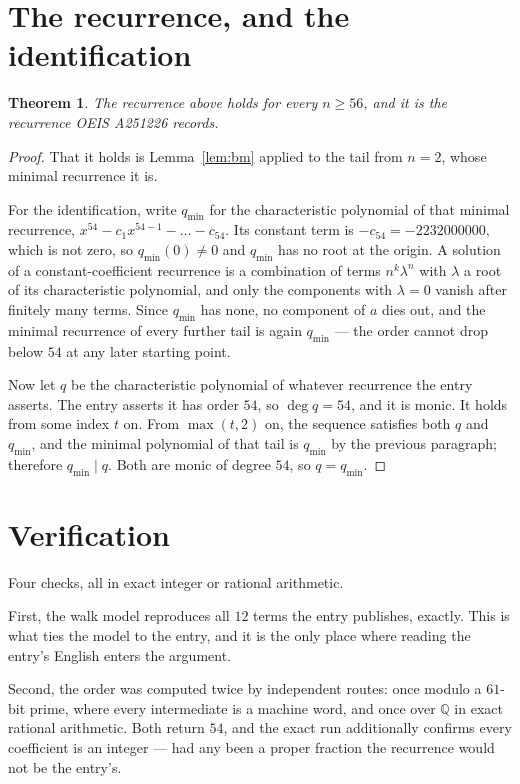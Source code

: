 \documentclass[11pt,a4paper]{article}
\theoremstyle{plain}
\newtheorem{theorem}{Theorem}
\theoremstyle{definition}
\begin{document}
\section{The recurrence, and the identification}

\begin{theorem}
The recurrence above holds for every $n\ge56$, and it is the recurrence OEIS A251226 records.
\end{theorem}

\begin{proof}
That it holds is Lemma~\ref{lem:bm} applied to the tail from $n=2$, whose minimal
recurrence it is.

For the identification, write $q_{\min}$ for the characteristic polynomial of that minimal
recurrence, $x^{54}-c_1x^{54-1}-\dots-c_{54}$. Its constant term is
$-c_{54}=-2232000000$, which is not zero, so $q_{\min}(0)\neq0$ and $q_{\min}$ has no
root at the origin. A solution of a constant-coefficient recurrence is a combination of terms
$n^{k}\lambda^{n}$ with $\lambda$ a root of its characteristic polynomial, and only the
components with $\lambda=0$ vanish after finitely many terms. Since $q_{\min}$ has none, no
component of $a$ dies out, and the minimal recurrence of every further tail is again
$q_{\min}$ --- the order cannot drop below $54$ at any later starting point.

Now let $q$ be the characteristic polynomial of whatever recurrence the entry asserts. The
entry asserts it has order $54$, so $\deg q=54$, and it is monic. It holds from some
index $t$ on. From $\max(t,2)$ on, the sequence satisfies both $q$ and $q_{\min}$, and
the minimal polynomial of that tail is $q_{\min}$ by the previous paragraph; therefore
$q_{\min}\mid q$. Both are monic of degree $54$, so $q=q_{\min}$.
\end{proof}

\section{Verification}

Four checks, all in exact integer or rational arithmetic.

First, the walk model reproduces all $12$ terms the entry publishes, exactly. This is
what ties the model to the entry, and it is the only place where reading the entry's English
enters the argument.

Second, the order was computed twice by independent routes: once modulo a $61$-bit prime, where
every intermediate is a machine word, and once over $\mathbb{Q}$ in exact rational arithmetic.
Both return $54$, and the exact run additionally confirms every coefficient is an integer
--- had any been a proper fraction the recurrence would not be the entry's.
\end{document}
